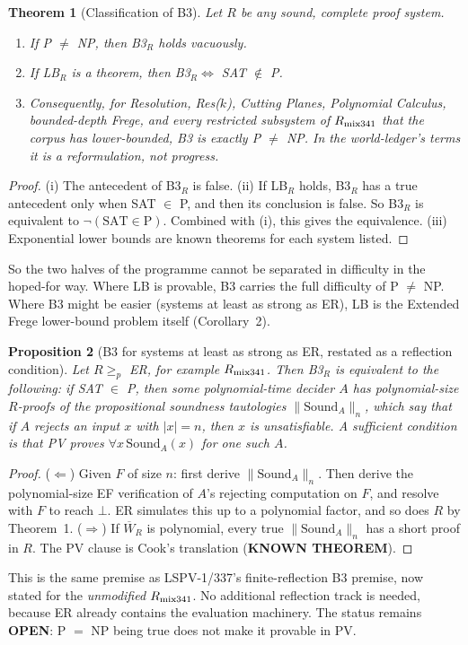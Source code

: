 \documentclass[11pt]{article}
\newtheorem{theorem}{Theorem}
\newtheorem{proposition}[theorem]{Proposition}
\begin{document}
\begin{theorem}[Classification of B3]
Let $R$ be any sound, complete proof system.
\begin{enumerate}
\item[(i)] If P $\neq$ NP, then B3$_R$ holds vacuously.
\item[(ii)] If LB$_R$ is a theorem, then B3$_R\iff$ SAT $\notin$ P.
\item[(iii)] Consequently, for Resolution, Res($k$), Cutting Planes, Polynomial Calculus, bounded-depth Frege, and every restricted subsystem of $R_{\rm mix341}$ that the corpus has lower-bounded, B3 is \emph{exactly} P $\neq$ NP. In the world-ledger's terms it is a reformulation, not progress.
\end{enumerate}
\end{theorem}
\begin{proof}
(i) The antecedent of B3$_R$ is false. (ii) If LB$_R$ holds, B3$_R$ has a true antecedent only when SAT $\in$ P, and then its conclusion is false. So B3$_R$ is equivalent to $\neg(\mathrm{SAT}\in\mathrm P)$. Combined with (i), this gives the equivalence. (iii) Exponential lower bounds are known theorems for each system listed.
\end{proof}
\noindent So the two halves of the programme cannot be separated in difficulty in the hoped-for way. Where LB is provable, B3 carries the full difficulty of P $\neq$ NP. Where B3 might be easier (systems at least as strong as ER), LB is the Extended Frege lower-bound problem itself (Corollary~2).

\begin{proposition}[B3 for systems at least as strong as ER, restated as a reflection condition]
Let $R\ge_p$ ER, for example $R_{\rm mix341}$. Then B3$_R$ is equivalent to the following: if SAT $\in$ P, then some polynomial-time decider $A$ has polynomial-size $R$-proofs of the propositional soundness tautologies $\|\mathrm{Sound}_A\|_n$, which say that if $A$ rejects an input $x$ with $|x|=n$, then $x$ is unsatisfiable. A sufficient condition is that PV proves $\forall x\,\mathrm{Sound}_A(x)$ for one such $A$.
\end{proposition}
\begin{proof}
($\Leftarrow$) Given $F$ of size $n$: first derive $\|\mathrm{Sound}_A\|_n$. Then derive the polynomial-size EF verification of $A$'s rejecting computation on $F$, and resolve with $F$ to reach $\bot$. ER simulates this up to a polynomial factor, and so does $R$ by Theorem~1. ($\Rightarrow$) If $\overline W_R$ is polynomial, every true $\|\mathrm{Sound}_A\|_n$ has a short proof in $R$. The PV clause is Cook's translation (\textbf{KNOWN THEOREM}).
\end{proof}
\noindent This is the same premise as LSPV-1/337's finite-reflection B3 premise, now stated for the \emph{unmodified} $R_{\rm mix341}$. No additional reflection track is needed, because ER already contains the evaluation machinery. The status remains \textbf{OPEN}: P $=$ NP being true does not make it provable in PV.
\end{document}
